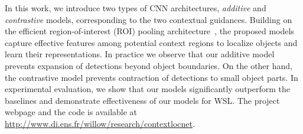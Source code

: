
In this work, we introduce two types of CNN architectures, {\it additive} and
{\it contrastive} models, corresponding to the two contextual guidances. 
Building on the efficient region-of-interest (ROI) pooling
architecture~\cite{ren15fasterrcnn}, the proposed models capture effective
features among potential context regions to localize objects and learn their
representations.
In practice we observe that our additive model prevents expansion of detections
beyond object boundaries. On the other hand, the contrastive model prevents
contraction of detections to small object parts.
In experimental evaluation, we show that our models
significantly outperform the baselines and demonstrate effectiveness of our models for WSL. The project webpage and the code is available at \url{http://www.di.ens.fr/willow/research/contextlocnet}.